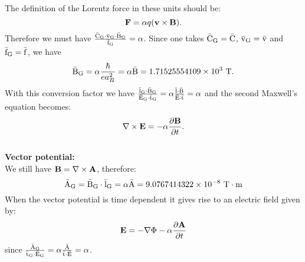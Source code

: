 \documentclass[12pt,a4paper,twoside]{report}
\def\barbg{1.71525554109\times 10^{3}}
\def\baravg{9.0767414322\times 10^{-8}}
\begin{document}
{{
The definition of the Lorentz force in these units should be:
\begin{equation}
{\bf F}=\alpha q ({\bf v}\times {\bf B}).
\end{equation}
Therefore we must have
${{\rm \bar C_G}\cdot {\rm \bar v_G}\cdot {\rm \bar B_G} \over {\rm \bar f_G}} = \alpha$. Since one
takes ${\rm \bar C_G}={\rm \bar C}$, ${\rm \bar v_G}={\rm \bar v}$ and ${\rm \bar f_G}={\rm \bar f}$, we have 
\begin{equation}
{\rm \bar B_G}=\alpha {\hbar \over e a_B^2}=\alpha {\rm \bar B}=\barbg\ {\rm T}.
\end{equation}
With this conversion factor we have ${{\rm \bar l_G}\cdot {\rm \bar B_G} \over {\rm \bar E_G}\cdot
{\rm \bar t_G}}=\alpha {{\rm \bar l}\cdot {\rm \bar B} \over {\rm \bar E}
\cdot {\rm \bar t}}=\alpha$ and the second Maxwell's equation becomes:
\begin{equation}
\nabla \times {\bf E}=-\alpha {\partial {\bf B} \over \partial t}.
\end{equation}\\
{\bf Vector potential:\\}
We still have ${\bf B}=\nabla \times {\bf A}$, therefore:
\begin{equation}
{\rm \bar A_G}={\rm \bar B_G}\cdot {\rm \bar l_G}=\alpha {\rm \bar A}= \baravg\ {\rm T} \cdot {\rm m}
\end{equation}
When the vector potential is time dependent it gives rise to an electric field
given by:
\begin{equation}
{\bf E}=-\nabla \Phi - \alpha {\partial {\bf A} \over \partial t}
\end{equation}
since ${{\rm \bar A_G} \over {\rm \bar t_G}\cdot {\rm \bar E_G}}=\alpha
{{\rm \bar A} \over {\rm \bar t}\cdot {\rm \bar E}}=\alpha$.\\

}}
\end{document}
